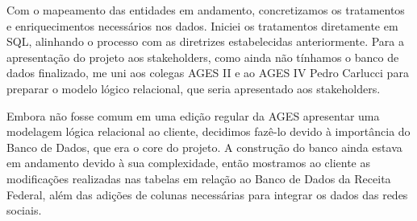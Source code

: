 \indent Com o mapeamento das entidades em andamento, concretizamos os tratamentos e enriquecimentos necessários nos dados. Iniciei os tratamentos diretamente em SQL, alinhando o processo com as diretrizes estabelecidas anteriormente. Para a apresentação do projeto aos stakeholders, como ainda não tínhamos o banco de dados finalizado, me uni aos colegas AGES II e ao AGES IV Pedro Carlucci para preparar o modelo lógico relacional, que seria apresentado aos stakeholders.\par

\indent Embora não fosse comum em uma edição regular da AGES apresentar uma modelagem lógica relacional ao cliente, decidimos fazê-lo devido à importância do Banco de Dados, que era o core do projeto. A construção do banco ainda estava em andamento devido à sua complexidade, então mostramos ao cliente as modificações realizadas nas tabelas em relação ao Banco de Dados da Receita Federal, além das adições de colunas necessárias para integrar os dados das redes sociais.\par

